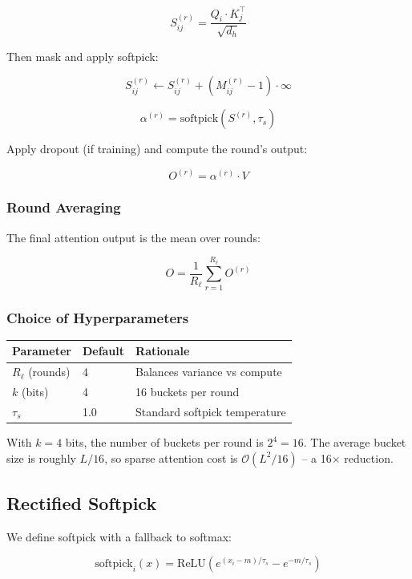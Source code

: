 \[
S^{(r)}_{ij} = \frac{Q_i \cdot K_j^\top}{\sqrt{d_h}}
\tag{4.19}
\]

Then mask and apply softpick:

\[
S^{(r)}_{ij} \leftarrow S^{(r)}_{ij} + (M^{(r)}_{ij} - 1) \cdot \infty
\tag{4.20}
\]

\[
\alpha^{(r)} = \text{softpick}(S^{(r)}, \tau_s)
\tag{4.21}
\]

Apply dropout (if training) and compute the round's output:

\[
O^{(r)} = \alpha^{(r)} \cdot V
\tag{4.22}
\]

\subsubsection{Round Averaging}

The final attention output is the mean over rounds:

\[
O = \frac{1}{R_\ell} \sum_{r=1}^{R_\ell} O^{(r)}
\tag{4.23}
\]

\subsubsection{Choice of Hyperparameters}

\begin{table}[H]
\centering
\small
\begin{tabular}{lll}
\toprule
\textbf{Parameter} & \textbf{Default} & \textbf{Rationale} \\
\midrule
$R_\ell$ (rounds) & 4 & Balances variance vs compute \\
$k$ (bits) & 4 & 16 buckets per round \\
$\tau_s$ & 1.0 & Standard softpick temperature \\
\bottomrule
\end{tabular}
\end{table}

With $k = 4$ bits, the number of buckets per round is $2^4 = 16$. The average 
bucket size is roughly $L / 16$, so sparse attention cost is 
$\mathcal{O}(L^2 / 16)$ -- a 16$\times$ reduction.

\subsection{Rectified Softpick}

We define softpick with a fallback to softmax:

\[
\text{softpick}_i(x) = \text{ReLU}\!\left(e^{(x_i - m)/\tau_s} - e^{-m/\tau_s}\right)
\tag{4.24}
\]

